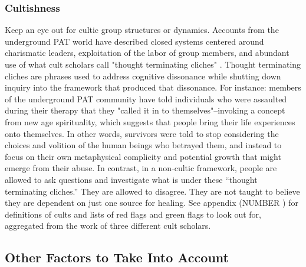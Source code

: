 \documentclass[12pt,letterpaper]{book}
\begin{document}
\subsubsection*{Cultishness}
Keep an eye out for cultic group structures or dynamics. Accounts from the underground PAT world have described closed systems centered around charismatic leaders, exploitation of the labor of group members, and abundant use of what cult scholars call "thought terminating cliches" \cite{powerTrip,thoughtTerminating}. Thought terminating cliches are phrases used to address cognitive dissonance while shutting down inquiry into the framework that produced that dissonance. For instance: members of the underground PAT community have told individuals who were assaulted during their therapy that they "called it in to themselves"–invoking a concept from new age spirituality, which suggests that people bring their life experiences onto themselves. In other words, survivors were told to stop considering the choices and volition of the human beings who betrayed them, and instead to focus on their own metaphysical complicity and potential growth that might emerge from their abuse. In contrast, in a non-cultic framework, people are allowed to ask questions and investigate what is under these “thought terminating cliches.” They are allowed to disagree. They are not taught to believe they are dependent on just one source for healing. See appendix (NUMBER ) for definitions of cults and lists of red flags and green flags to look out for, aggregated from the work of three different cult scholars. 

\subsection*{Other Factors to Take Into Account}
\end{document}
